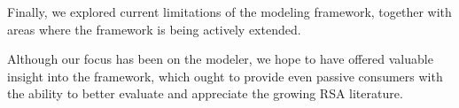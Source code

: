 \documentclass{sp}
\begin{document}
Finally, we explored current limitations of the modeling framework, together with areas where the framework is being actively extended.

Although our focus has been on the modeler, we hope to have offered valuable insight into the framework, which ought to provide even passive consumers with the ability to better evaluate and appreciate the growing RSA literature.






\end{document}
